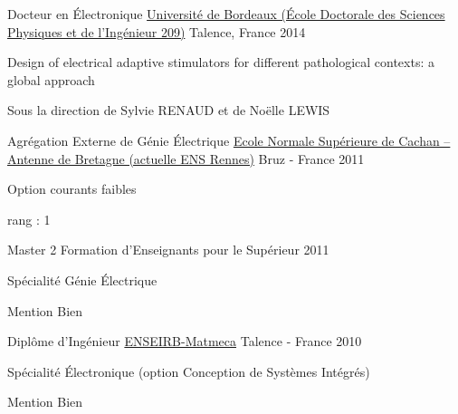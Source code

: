 

\begin{cventries}

  \cventry
    {Docteur en Électronique} %
    {\href{https://ed-spi.u-bordeaux.fr}{Université de Bordeaux  (École Doctorale des Sciences Physiques et de l’Ingénieur 209)}} %
    {Talence, France} %
    {2014} %
    {
      \begin{cvitems} %
        \item {Design of electrical adaptive stimulators for different pathological contexts: a global approach}
        \item {Sous la direction de Sylvie RENAUD et de Noëlle LEWIS}
      \end{cvitems}
    }
    
  \cventry
    {Agrégation Externe de Génie Électrique } %
    {\href{https://www.ens-rennes.fr}{Ecole Normale Supérieure de Cachan – Antenne de Bretagne (actuelle ENS Rennes)}} %
    {Bruz - France} %
    {2011} %
    {
      \begin{cvitems} %
        \item {Option courants faibles}
        \item {rang :  1} 
      \end{cvitems}
    }
    
  \cventry
    {Master 2 Formation d’Enseignants pour le Supérieur} %
    {} %
    {} %
    {2011} %
    {
      \begin{cvitems} %
        \item {Spécialité Génie Électrique}
        \item {Mention Bien}
      \end{cvitems}
    }
    
  \cventry
    {Diplôme d'Ingénieur} %
    {\href{https://enseirb-matmeca.bordeaux-inp.fr/fr}{ENSEIRB-Matmeca}} %
    {Talence - France} %
    {2010} %
    {
      \begin{cvitems} %
        \item {Spécialité Électronique (option Conception de Systèmes Intégrés)}
        \item {Mention Bien}
      \end{cvitems}
    }
   

\end{cventries}

